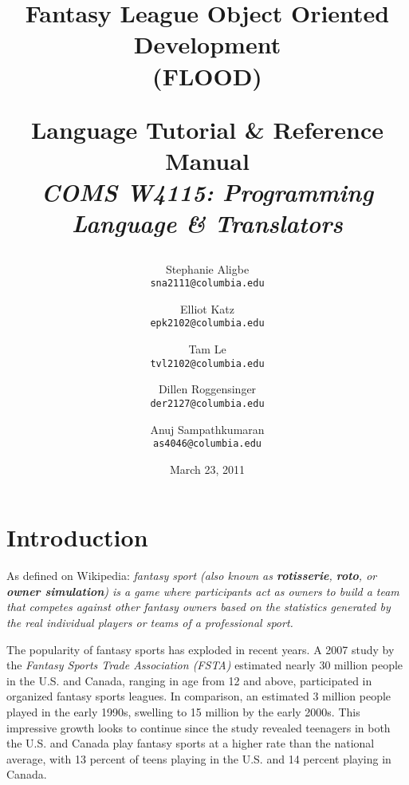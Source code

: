 \documentclass[12pt]{report}
\begin{document}
\title{
\textbf{Fantasy League Object Oriented Development}\\
\textbf{(FLOOD)}\\
\begin{doublespace}
\end{doublespace}
\LARGE{Language Tutorial \& Reference Manual}\\
{\normalsize \textit{COMS W4115: Programming Language \& Translators}}
}

\begin{singlespace}
\author{
  Stephanie Aligbe\\
  \texttt{\small{sna2111@columbia.edu}}
  \and
  Elliot Katz\\
  \texttt{\small{epk2102@columbia.edu}}
  \and
  Tam Le\\
  \texttt{\small{tvl2102@columbia.edu}}
  \and
  Dillen Roggensinger\\
  \texttt{\small{der2127@columbia.edu}}
  \and
  Anuj Sampathkumaran\\
  \texttt{\small{as4046@columbia.edu}}
}
\end{singlespace}

\date{March 23, 2011}

\maketitle

\doublespacing

\tableofcontents

\chapter{Introduction}

As defined on Wikipedia: \textit{fantasy sport (also known as \textbf{rotisserie}, \textbf{roto}, or \textbf{owner simulation}) is a game where participants act as owners to build a team that competes against other fantasy owners based on the statistics generated by the real individual players or teams of a professional sport.}

The popularity of fantasy sports has exploded in recent years. A 2007 study by the \textit{Fantasy Sports Trade Association (FSTA)} estimated  nearly 30 million people in the U.S. and Canada, ranging in age from 12 and above, participated in organized fantasy sports leagues. In comparison, an estimated 3 million people played in the early 1990s, swelling to 15 million by the early 2000s. This impressive growth looks to continue since the study revealed teenagers in both the U.S. and Canada play fantasy sports at a higher rate than the national average, with 13 percent of teens playing in the U.S. and 14 percent playing in Canada.
\end{document}
